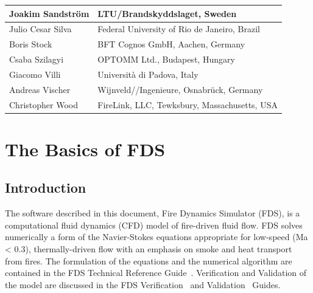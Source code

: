\documentclass[11pt]{book}
\begin{document}
\begin{longtable}{|l|l|}
Joakim Sandstr\"{o}m                    & LTU/Brandskyddslaget, Sweden                                              \\ \hline
Julio Cesar Silva                       & Federal University of Rio de Janeiro, Brazil                              \\ \hline
Boris Stock                             & BFT Cognos GmbH, Aachen, Germany                                          \\ \hline
Csaba Szilagyi                          & OPTOMM Ltd., Budapest, Hungary                                            \\ \hline
Giacomo Villi                           & Universit\`{a} di Padova, Italy                                           \\ \hline
Andreas Vischer                         & Wijnveld//Ingenieure, Osnabr\"{u}ck, Germany                              \\ \hline
Christopher Wood                        & FireLink, LLC, Tewksbury, Massachusetts, USA                              \\ \hline
\end{longtable}

\cleardoublepage
{}
{}
\tableofcontents

\cleardoublepage
{}
{}
\listoffigures

\cleardoublepage
{}
{}
\listoftables


\mainmatter



\part{The Basics of FDS}


\chapter{Introduction}

The software described in this document, Fire Dynamics Simulator (FDS), is a computational fluid dynamics (CFD) model of fire-driven fluid flow. FDS solves numerically a form of the Navier-Stokes equations appropriate for low-speed (Ma < 0.3), thermally-driven flow with an emphasis on smoke and heat transport from fires. The formulation of the equations and the numerical algorithm are contained in the FDS Technical Reference Guide~\cite{FDS_Math_Guide}. Verification and Validation of the model are discussed in the FDS Verification~\cite{FDS_Verification_Guide} and Validation~\cite{FDS_Validation_Guide} Guides.
\end{document}
